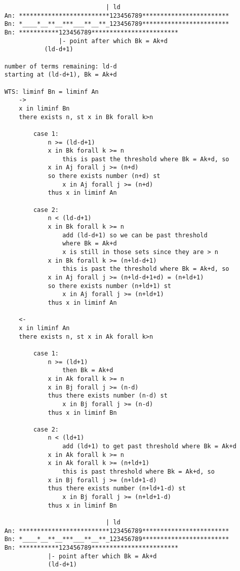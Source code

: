 \documentclass{article}
\begin{document}
\begin{flushleft}
\begin{verbatim}
                                | ld
    An: *************************123456789************************
    Bn: *____*__**__***___**__**_123456789************************
    Bn: ***********123456789************************
                   |- point after which Bk = Ak+d
               (ld-d+1)

    number of terms remaining: ld-d
    starting at (ld-d+1), Bk = Ak+d

    WTS: liminf Bn = liminf An 
        ->
        x in liminf Bn 
        there exists n, st x in Bk forall k>n 
                     
            case 1:
                n >= (ld-d+1)
                x in Bk forall k >= n 
                    this is past the threshold where Bk = Ak+d, so 
                x in Aj forall j >= (n+d)
                so there exists number (n+d) st 
                    x in Aj forall j >= (n+d)
                thus x in liminf An 

            case 2:
                n < (ld-d+1) 
                x in Bk forall k >= n 
                    add (ld-d+1) so we can be past threshold 
                    where Bk = Ak+d 
                    x is still in those sets since they are > n
                x in Bk forall k >= (n+ld-d+1)
                    this is past the threshold where Bk = Ak+d, so 
                x in Aj forall j >= (n+ld-d+1+d) = (n+ld+1)
                so there exists number (n+ld+1) st 
                    x in Aj forall j >= (n+ld+1) 
                thus x in liminf An 

        <- 
        x in liminf An 
        there exists n, st x in Ak forall k>n 

            case 1: 
                n >= (ld+1)
                    then Bk = Ak+d
                x in Ak forall k >= n 
                x in Bj forall j >= (n-d)
                thus there exists number (n-d) st 
                    x in Bj forall j >= (n-d) 
                thus x in liminf Bn 

            case 2:
                n < (ld+1)
                    add (ld+1) to get past threshold where Bk = Ak+d
                x in Ak forall k >= n 
                x in Ak forall k >= (n+ld+1)
                    this is past threshold where Bk = Ak+d, so 
                x in Bj forall j >= (n+ld+1-d)
                thus there exists number (n+ld+1-d) st 
                    x in Bj forall j >= (n+ld+1-d) 
                thus x in liminf Bn
    
                                | ld
    An: *************************123456789************************
    Bn: *____*__**__***___**__**_123456789************************
    Bn: ***********123456789************************
                |- point after which Bk = Ak+d
                (ld-d+1)
                


\end{verbatim}
\end{flushleft}
\end{document}
